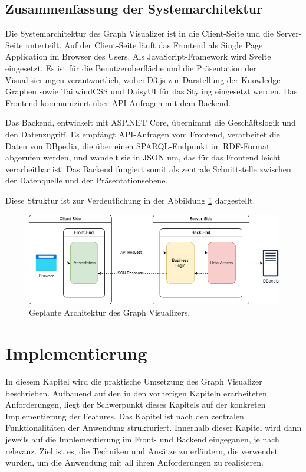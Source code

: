 \subsection{Zusammenfassung der Systemarchitektur}

Die Systemarchitektur des Graph Visualizer ist in die Client-Seite und die Server-Seite unterteilt. Auf der Client-Seite läuft das Frontend als Single Page Application im Browser des Users. Als JavaScript-Framework wird Svelte eingesetzt. Es ist für die Benutzeroberfläche und die Präsentation der Visualisierungen verantwortlich, wobei D3.js zur Darstellung der Knowledge Graphen sowie TailwindCSS und DaisyUI für das Styling eingesetzt werden. Das Frontend kommuniziert über API-Anfragen mit dem Backend.

Das Backend, entwickelt mit ASP.NET Core, übernimmt die Geschäftslogik und den Datenzugriff. Es empfängt API-Anfragen vom Frontend, verarbeitet die Daten von DBpedia, die über einen SPARQL-Endpunkt im RDF-Format abgerufen werden, und wandelt sie in JSON um, das für das Frontend leicht verarbeitbar ist. Das Backend fungiert somit als zentrale Schnittstelle zwischen der Datenquelle und der Präsentationsebene.

Diese Struktur ist zur Verdeutlichung in der Abbildung \ref{fig:realization:concept:architecture} dargestellt.

\begin{figure}[h]
    \centering
    \includegraphics[height=.35\textwidth]{images/03/Architecture.drawio.png}
    \caption{Geplante Architektur des Graph Visualizers.}
    \label{fig:realization:concept:architecture}
\end{figure}

\section{Implementierung}

In diesem Kapitel wird die praktische Umsetzung des Graph Visualizer beschrieben. Aufbauend auf den in den vorherigen Kapiteln erarbeiteten Anforderungen, liegt der Schwerpunkt dieses Kapitels auf der konkreten Implementierung der Features. Das Kapitel ist nach den zentralen Funktionalitäten der Anwendung strukturiert. Innerhalb dieser Kapitel wird dann jeweils auf die Implementierung im Front- und Backend eingeganen, je nach relevanz. Ziel ist es, die Techniken und Ansätze zu erläutern, die verwendet wurden, um die Anwendung mit all ihren Anforderungen zu realisieren.

